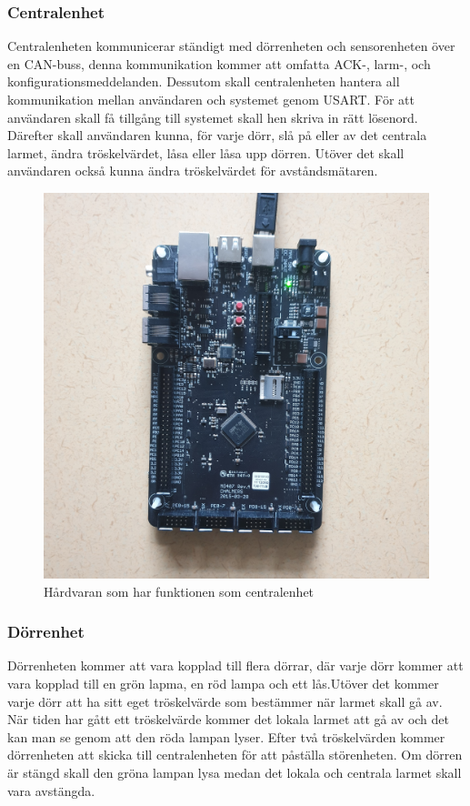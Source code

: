 \documentclass{article}
\begin{document}
\subsubsection{Centralenhet}
Centralenheten kommunicerar ständigt med dörrenheten och sensorenheten över en CAN-buss, denna kommunikation kommer att omfatta ACK-, larm-, och konfigurationsmeddelanden. 
Dessutom skall centralenheten hantera all kommunikation mellan användaren och systemet genom USART. För att användaren skall få tillgång till systemet skall hen skriva in rätt lösenord. 
Därefter skall användaren kunna, för varje dörr, slå på eller av det centrala larmet, ändra tröskelvärdet, låsa eller låsa upp dörren. 
Utöver det skall användaren också kunna ändra tröskelvärdet för avståndsmätaren.
\begin{figure}[h]
    \centering
    \includegraphics[scale=0.05]{Projektrapport/central.png}
    \caption {Hårdvaran som har funktionen som centralenhet}
    \label{fig:drawing}
\end{figure}

\subsubsection{Dörrenhet}

Dörrenheten kommer att vara kopplad till flera dörrar, där varje dörr kommer att vara kopplad till en grön lapma, en röd lampa och ett lås.Utöver det kommer varje dörr att ha sitt eget tröskelvärde som bestämmer när larmet skall gå av. 
När tiden har gått ett tröskelvärde kommer det lokala larmet att gå av och det kan man se genom att den röda lampan lyser. 
Efter två tröskelvärden kommer dörrenheten att skicka till centralenheten för att påställa störenheten. 
Om dörren är stängd skall den gröna lampan lysa medan det lokala och centrala larmet skall vara avstängda. 
\end{document}
